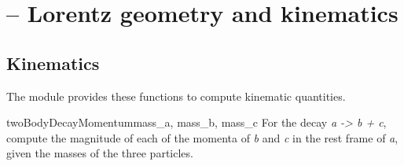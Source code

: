 \section{ -- Lorentz geometry and kinematics}


\subsection{Kinematics}

The  module provides these functions to compute
kinematic quantities.

\begin{funcdesc}{twoBodyDecayMomentum}{mass_a, mass_b, mass_c}
 For the decay \emph{a -> b + c}, compute the magnitude of each of the
 momenta of \emph{b} and \emph{c} in the rest frame of \emph{a}, given
 the masses of the three particles.
\end{funcdesc}
